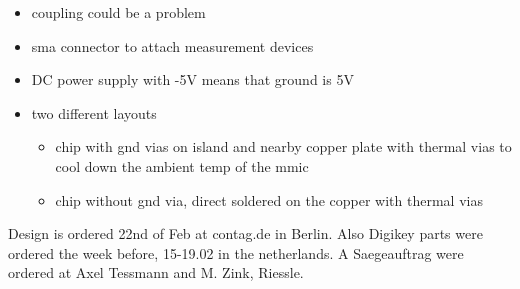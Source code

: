 \begin{itemize}
	\item coupling could be a problem
	\item sma connector to attach measurement devices
	\item DC power supply with -5V means that ground is 5V
	\item two different layouts
	\begin{itemize}
		\item chip with gnd vias on island and nearby copper plate with thermal vias to cool down the ambient temp of the mmic
		\item chip without gnd via, direct soldered on the copper with thermal vias
	\end{itemize}
\end{itemize}

Design is ordered 22nd of Feb at contag.de in Berlin.
Also Digikey parts were ordered the week before, 15-19.02 in the netherlands. A Saegeauftrag were ordered at Axel Tessmann and M. Zink, Riessle. 